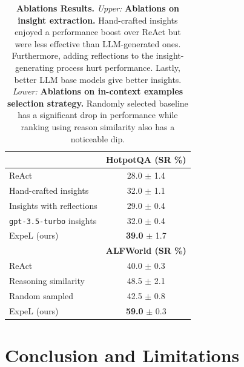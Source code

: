 \documentclass[letterpaper]{article} %
\begin{document}
\begin{table}[ht]
    \centering
    \begin{tabular}{lc}
      \toprule
      \rowcolor{MK_Three_One!10} & \textbf{HotpotQA (SR \%)} \\
      \midrule
      ReAct & 28.0 $\pm$ 1.4 \\
       \rowcolor{MK_Three_One!10} Hand-crafted insights & 32.0 $\pm$ 1.1 \\
       Insights with reflections & 29.0 $\pm$ 0.4 \\
       \rowcolor{MK_Three_One!10} \texttt{gpt-3.5-turbo} insights & 32.0 $\pm$ 0.4 \\
       ExpeL (ours) & \textbf{39.0} $\pm$ 1.7 \\
       \bottomrule
       \toprule
       \rowcolor{MK_Three_One!10} & \textbf{ALFWorld (SR \%)} \\
       \midrule
       ReAct & 40.0 $\pm$ 0.3 \\
       \rowcolor{MK_Three_One!10} Reasoning similarity & 48.5 $\pm$ 2.1 \\
       Random sampled & 42.5 $\pm$ 0.8 \\
       \rowcolor{MK_Three_One!10} ExpeL (ours) & \textbf{59.0} $\pm$ 0.3 \\
       \bottomrule
    \end{tabular}
    
    \caption{\textbf{Ablations Results.} \textit{Upper:} \textbf{Ablations on insight extraction.} Hand-crafted insights enjoyed a performance boost over ReAct but were less effective than LLM-generated ones. Furthermore, adding reflections to the insight-generating process hurt performance. Lastly, better LLM base models give better insights. \textit{Lower:} \textbf{Ablations on in-context examples selection strategy.} Randomly selected baseline has a significant drop in performance while ranking using reason similarity also has a noticeable dip.}
    \label{tab:ablation}
  \end{table}

\section{Conclusion and Limitations}
\end{document}
